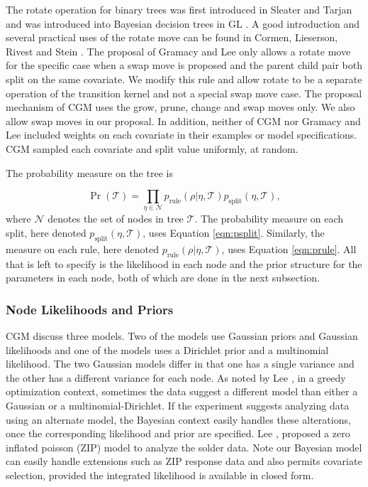   The rotate operation for binary trees was first introduced in Sleater and Tarjan \cite{sleator1985self} and was introduced into Bayesian decision trees in GL \cite{gramacy2008bayesian}. A good introduction and several practical uses of the rotate move can be found in Cormen, Lieserson, Rivest and Stein \cite{cormen2001introduction}. The proposal of Gramacy and Lee \cite{gramacy2008bayesian} only allows a rotate move for the specific case when a swap move is proposed and the parent child pair both split on the same covariate. We modify this rule and allow rotate to be a separate operation of the transition kernel and not a special swap move case. The proposal mechanism of CGM uses the grow, prune, change and swap moves only. We also allow swap moves in our proposal. In addition, neither of CGM nor Gramacy and Lee \cite{gramacy2008bayesian} included weights on each covariate in their examples or model specifications. CGM sampled each covariate and split value uniformly, at random. 
  
 The probability measure on the tree is  
 
 \begin{equation}
 \Pr(\mathcal{T}) = \prod_{\eta \in \mathcal{N}} p_{\text{rule}}(\rho \vert \eta, \mathcal{T})p_{\text{split}}(\eta, \mathcal{T}),
\end{equation}
where $\mathcal{N}$ denotes the set of nodes in tree $\mathcal{T}$.
The probability measure on each split, here denoted $p_{\text{split}}(\eta, \mathcal{T})$, uses Equation \ref{eqn:psplit}. Similarly, the measure on each rule, here denoted $p_{\text{rule}}(\rho \vert \eta, \mathcal{T})$, uses Equation \ref{eqn:prule}. 
All that is left to specify is the likelihood in each node and the prior structure for the parameters in each node, both of which are done in the next subsection. 

\subsubsection{Node Likelihoods and Priors}

CGM discuss three models. Two of the models use Gaussian priors and Gaussian likelihoods and one of the models uses a Dirichlet prior and a multinomial likelihood. The two Gaussian models differ in that one has a single variance and the other has a different variance for each node. As noted by Lee \cite{lee2006decision}, in a greedy optimization context, sometimes the data suggest a different model than either a Gaussian or a multinomial-Dirichlet. If the experiment suggests analyzing data using an alternate model, the Bayesian context easily handles these alterations, once the corresponding likelihood and prior are specified. Lee \cite{lee2006decision}, proposed a zero inflated poisson (ZIP) model to analyze the solder data. Note our Bayesian model can easily handle extensions such as ZIP response data and also permits covariate selection, provided the integrated likelihood is available in closed form.

